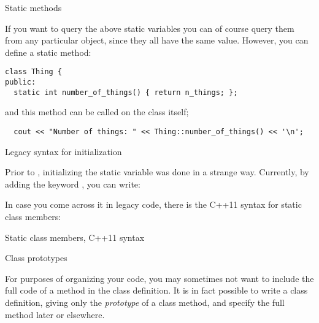 {Static methods}

If you want to query the above static variables
you can of course query them from any particular object,
since they all have the same value.
However, you can define a static method:
\begin{lstlisting}
class Thing {
public:
  static int number_of_things() { return n_things; };
\end{lstlisting}
and this method can be called on the class itself;
\begin{lstlisting}
  cout << "Number of things: " << Thing::number_of_things() << '\n';
\end{lstlisting}

 {Legacy syntax for initialization}

Prior to , initializing the static variable was
done in a strange way. Currently, by adding the keyword ,
you can write:


\begin{comment}
  \Level 1 {Static members}
  \begin{block}{Static class members}
    \label{sl:static-member}
    A static member acts as if it's shared between all objects.\\
    (Note: C++17 syntax)
    \snippetwithoutput{classstatic17}{link}{static17}
  \end{block}
\end{comment}

In case you come across it in legacy code,
there is the C++11 syntax for static class members:

\begin{block}{Static class members, C++11 syntax}
  \label{sl:static-member11}
\end{block}

 {Class prototypes}

For purposes of organizing your code,
you may sometimes not want to include the full code of a method
in the class definition.
It is in fact possible to write a class definition, giving only the
\emph{prototype}
of a class method,
and specify the full method later or elsewhere.

